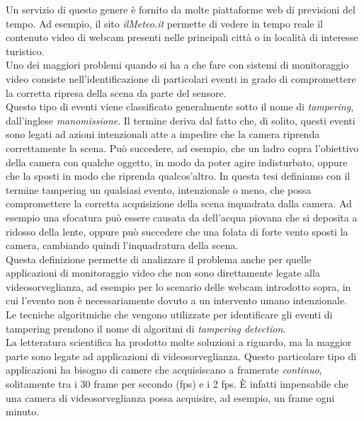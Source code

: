 Un servizio di questo genere \`e fornito da molte piattaforme web di previsioni del tempo.
Ad esempio, il sito \textit{ilMeteo.it} \cite{ilmeteo} permette di vedere in tempo reale il contenuto video di webcam presenti nelle principali citt\`a o in localit\`a di interesse turistico.\\
Uno dei maggiori problemi quando si ha a che fare con sistemi di monitoraggio video consiste nell'identificazione di particolari eventi in grado di compromettere la corretta ripresa della scena da parte del sensore.\\
Questo tipo di eventi viene classificato generalmente sotto il nome di \textit{tampering}, dall'inglese \textit{manomissione}.
Il termine deriva dal fatto che, di solito, questi eventi sono legati ad azioni intenzionali atte a impedire che la camera riprenda correttamente la scena.
Pu\`o succedere, ad esempio, che un ladro copra l'obiettivo della camera con qualche oggetto, in modo da poter agire indisturbato, oppure che la sposti in modo che riprenda qualcos'altro.
In questa tesi definiamo con il termine tampering un qualsiasi evento, intenzionale o meno, che possa compromettere la corretta acquisizione della scena inquadrata dalla camera.
Ad esempio una sfocatura pu\`o essere causata da dell'acqua piovana che si deposita a ridosso della lente, oppure pu\`o succedere che una folata di forte vento sposti la camera, cambiando quindi l'inquadratura della scena.\\
Questa definizione permette di analizzare il problema anche per quelle applicazioni di monitoraggio video che non sono direttamente legate alla videosorveglianza, ad esempio per lo scenario delle webcam introdotto sopra, in cui l'evento non \`e necessariamente dovuto a un intervento umano intenzionale.\\
Le tecniche algoritmiche che vengono utilizzate per identificare gli eventi di tampering prendono il nome di algoritmi di \textit{tampering detection}.\\
La letteratura scientifica ha prodotto molte soluzioni a riguardo, ma la maggior parte sono legate ad applicazioni di videosorveglianza.
Questo particolare tipo di applicazioni ha bisogno di camere che acquisiscano a framerate \textit{continuo}, solitamente tra i 30 frame per secondo (fps) e i 2 fps.
\`E infatti impensabile che una camera di videosorveglianza possa acquisire, ad esempio, un frame ogni minuto.\\

